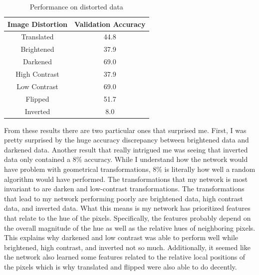 \documentclass{article}
\begin{document}
\begin{table}
  \begin{center}
    \begin{tabular}{ | c | c |}
      \hline
      Image Distortion & Validation Accuracy \\ \hline
      Translated   & 44.8          \\ \hline
      Brightened  & 37.9        \\ \hline
      Darkened & 69.0     \\ \hline
      High Contrast   & 37.9       \\ \hline
      Low Contrast   & 69.0       \\ \hline
      Flipped   & 51.7       \\ \hline
      Inverted   & 8.0       \\ \hline
    \end{tabular}
  \end{center}
  \caption{Performance on distorted data}
\end{table}


From these results there are two particular ones that surprised me. First, I was pretty surprised by the huge accuracy discrepancy between brightened data and darkened data. Another result that really intrigued me was seeing that inverted data only contained a 8\% accuracy. While I understand how the network would have problem with geometrical transformations, 8\% is literally how well a random algorithm would have performed. The transformations that my network is most invariant to are darken and low-contrast transformations. The transformations that lead to my network performing poorly are brightened data, high contrast data, and inverted data. What this means is my network has prioritized features that relate to the hue of the pixels. Specifically, the features probably depend on the overall magnitude of the hue as well as the relative hues of neighboring pixels. This explains why darkened and low contrast was able to perform well while brightened, high contrast, and inverted not so much. Additionally, it seemed like the network also learned some features related to the relative local positions of the pixels which is why translated and flipped were also able to do decently. 
\end{document}
